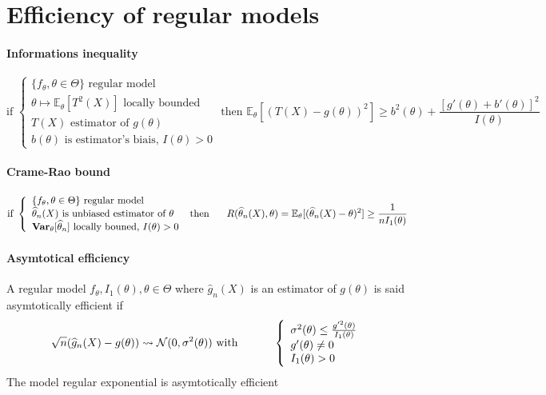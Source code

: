 \documentclass[a4paper,10pt]{article}
\begin{document}
\section{Efficiency of regular models}
\paragraph{Informations inequality}
\[
\text{if }
\left\{
\begin{array}{l}
\{f_{\theta}, \theta \in \Theta\} \text{ regular model} \\
\theta \mapsto \mathbb{E}_{\theta}[T^2(X)] \text{ locally bounded} \\
T(X) \text{ estimator of } g(\theta) \\
b(\theta) \text{ is estimator's biais, }I(\theta) > 0
\end{array}\right.
\text{ then }
\mathbb{E}_{\theta}[(T(X)-g(\theta))^2] \geq 
b^2(\theta) + \frac{[g'(\theta)+b'(\theta)]^2}{I(\theta)}
\]

\paragraph{Crame-Rao bound}
\[
\text{if }
\left\{
\begin{array}{l}
\{f_{\theta}, \theta \in \Theta\} \text{ regular model} \\
\widehat{\theta}_n(X) \text{ is unbiased estimator of } \theta \\
\textbf{Var}_{\theta}[\widehat{\theta}_n] \text{ locally bouned, } I(\theta) > 0 \\
\end{array}\right.
\text{ then  }
\hspace{5mm}
R(\widehat{\theta}_n(X),\theta) =
\mathbb{E}_{\theta}[(\widehat{\theta}_n(X)-\theta)^2] \geq 
\frac{1}{nI_1(\theta)}
\]
\paragraph{Asymtotical efficiency} A regular model ${f_{\theta}, I_1(\theta), \theta \in \Theta}$ where 
$\widehat{g}_n(X)$ is an estimator of $g(\theta)$ is said asymtotically efficient if
\[
\sqrt{n}(\widehat{g}_n(X) - g(\theta) )  \rightsquigarrow   \mathcal{N}(0,\sigma^{2}(\theta) ) 
\text{ with }
\hspace{10mm}
\left\{
\begin{array}{l}
\sigma^{2}(\theta) \leq \frac{g'^2(\theta)}{I_1(\theta)} \\
g'(\theta) \neq 0  \\
I_1(\theta) > 0 
\end{array}\right.
\]  
The model regular exponential is asymtotically efficient 
\end{document}
